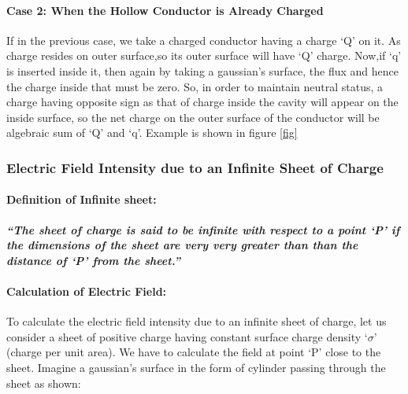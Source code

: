 \paragraph{Case 2: When the Hollow Conductor is Already Charged}
If in the previous case, we take a charged conductor having a charge ‘Q’
on it. As charge resides on outer surface,so its outer surface will have
‘Q’ charge. Now,if ‘q’ is inserted inside it, then again by
taking a gaussian’s surface, the flux and hence the charge inside
that must be zero. So, in order to maintain neutral status,
a charge having opposite sign as that of charge inside the cavity
will appear on the inside surface, so the net charge on the outer
surface of the conductor will be algebraic sum of ‘Q’ and ‘q’.
Example is shown in figure \ref{fig}

\subsubsection{Electric Field Intensity due to an Infinite Sheet of Charge}
\paragraph{Definition of Infinite sheet:}
\textit{\textbf{“The sheet of charge is said to be infinite with respect
to a point ‘P’ if the dimensions of the sheet are very very greater
than than the distance of ‘P’ from the sheet.”}}
\paragraph{Calculation of Electric Field:}
To calculate the electric field intensity due to an infinite
sheet of charge, let us consider a sheet of positive charge having
constant surface charge density ‘$\sigma$’ (charge per unit area).
We have to calculate the field at point ‘P’ close to the sheet.
Imagine a gaussian’s surface in the form of cylinder passing through
the sheet as shown:

